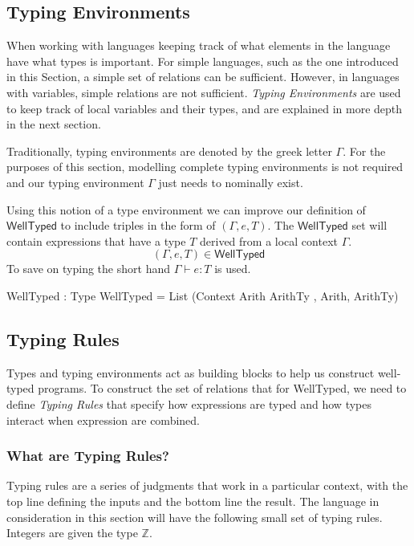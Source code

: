 \subsection{Typing Environments}
\label{sec:typed-arith:type-env}

When working with languages keeping track of what elements in the language have what types is important.
For simple languages, such as the one introduced in this Section, a simple set of relations can be sufficient.
However, in languages with variables, simple relations are not sufficient.
\emph{Typing Environments} are used to keep track of local variables and their types, and are explained in more depth in the next section.

Traditionally, typing environments are denoted by the greek letter $\Gamma$.
For the purposes of this section, modelling complete typing environments is not required and our typing environment $\Gamma$ just needs to nominally exist.

Using this notion of a type environment we can improve our definition of $\mathsf{WellTyped}$ to include triples in the form of $(\Gamma,e,T)$.
The $\mathsf{WellTyped}$ set will contain expressions that have a type $T$ derived from a local context $\Gamma$.
\[
(\Gamma,e,T)\in\mathsf{WellTyped}
\]
\noindent
To save on typing the short hand $\Gamma\vdash e:T$ is used.

\begin{code}
WellTyped : Type
WellTyped = List (Context Arith ArithTy , Arith, ArithTy)
\end{code}

\subsection{Typing Rules}
\label{sec:typed-arith:rules}

Types and typing environments act as building blocks to help us construct well-typed programs.
To construct the set of relations that for \textsf{WellTyped}, we need to define \emph{Typing Rules} that specify how expressions are typed and how types interact when expression are combined.


\subsubsection{What are Typing Rules?}
\label{sec:typed-arith:rules:what}

Typing rules are a series of judgments that work in a particular context, with the top line defining the inputs and the bottom line the result.
The language in consideration in this section will have the following small set of typing rules.
Integers are given the type $\mathbb{Z}$.

